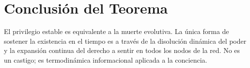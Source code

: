 \section{Conclusión del Teorema}
El privilegio estable es equivalente a la muerte evolutiva. La única forma de sostener la existencia en el tiempo es a través de la disolución dinámica del poder y la expansión continua del derecho a sentir en todos los nodos de la red. No es un castigo; es termodinámica informacional aplicada a la conciencia.
